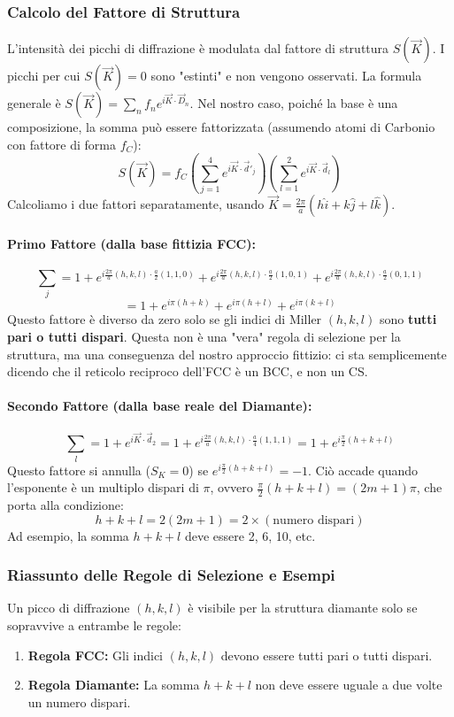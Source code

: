 \subsubsection{Calcolo del Fattore di Struttura}
L'intensità dei picchi di diffrazione è modulata dal fattore di struttura $S(\vec{K})$. I picchi per cui $S(\vec{K})=0$ sono "estinti" e non vengono osservati. La formula generale è $S(\vec{K}) = \sum_{n} f_n e^{i\vec{K} \cdot \vec{D}_n}$. Nel nostro caso, poiché la base è una composizione, la somma può essere fattorizzata (assumendo atomi di Carbonio con fattore di forma $f_C$):
$$ S(\vec{K}) = f_C \left( \sum_{j=1}^{4} e^{i\vec{K} \cdot \vec{d}'_j} \right) \left( \sum_{l=1}^{2} e^{i\vec{K} \cdot \vec{d}_l} \right) $$
Calcoliamo i due fattori separatamente, usando $\vec{K} = \frac{2\pi}{a}(h\hat{i} + k\hat{j} + l\hat{k})$.

\paragraph{Primo Fattore (dalla base fittizia FCC):}
$$ \sum_{j} = 1 + e^{i\frac{2\pi}{a}(h,k,l)\cdot\frac{a}{2}(1,1,0)} + e^{i\frac{2\pi}{a}(h,k,l)\cdot\frac{a}{2}(1,0,1)} + e^{i\frac{2\pi}{a}(h,k,l)\cdot\frac{a}{2}(0,1,1)} $$
$$ = 1 + e^{i\pi(h+k)} + e^{i\pi(h+l)} + e^{i\pi(k+l)} $$
Questo fattore è diverso da zero solo se gli indici di Miller $(h,k,l)$ sono \textbf{tutti pari o tutti dispari}. Questa non è una "vera" regola di selezione per la struttura, ma una conseguenza del nostro approccio fittizio: ci sta semplicemente dicendo che il reticolo reciproco dell'FCC è un BCC, e non un CS.

\paragraph{Secondo Fattore (dalla base reale del Diamante):}
$$ \sum_{l} = 1 + e^{i\vec{K} \cdot \vec{d}_2} = 1 + e^{i\frac{2\pi}{a}(h,k,l)\cdot\frac{a}{4}(1,1,1)} = 1 + e^{i\frac{\pi}{2}(h+k+l)} $$
Questo fattore si annulla ($S_K = 0$) se $e^{i\frac{\pi}{2}(h+k+l)} = -1$. Ciò accade quando l'esponente è un multiplo dispari di $\pi$, ovvero $\frac{\pi}{2}(h+k+l) = (2m+1)\pi$, che porta alla condizione:
$$ h+k+l = 2(2m+1) = 2 \times (\text{numero dispari}) $$
Ad esempio, la somma $h+k+l$ deve essere 2, 6, 10, etc.

\subsubsection{Riassunto delle Regole di Selezione e Esempi}
Un picco di diffrazione $(h,k,l)$ è visibile per la struttura diamante solo se sopravvive a entrambe le regole:
\begin{enumerate}
    \item \textbf{Regola FCC:} Gli indici $(h,k,l)$ devono essere tutti pari o tutti dispari.
    \item \textbf{Regola Diamante:} La somma $h+k+l$ non deve essere uguale a due volte un numero dispari.
\end{enumerate}

